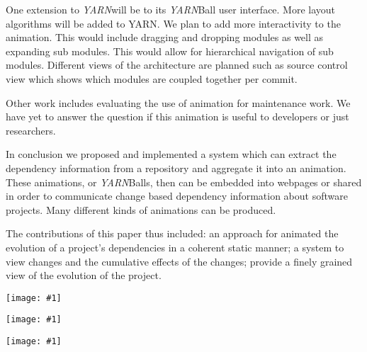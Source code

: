 \documentclass[times, 10pt,twocolumn]{article}
\newcommand{\igH}[1]{\texttt{[image: \#1]}}
\newcommand{\igW}[1]{\texttt{[image: \#1]}}
\newcommand{\yarn}{\emph{YARN\xspace}}
\newcommand{\YARN}{\yarn}
\newcommand{\postgresql}{\emph{PostgreSQL}\xspace}
\begin{document}



One extension to \YARN will be to its \YARN Ball user interface.  More
layout algorithms will be added to YARN.  We plan to add more interactivity
to the animation. This would include dragging and dropping modules as well
as expanding sub modules.  This would allow for hierarchical navigation of
sub modules.  Different views of the architecture are planned such as
source control view which shows which modules are coupled together per
commit.

Other work includes evaluating the use of animation for maintenance work.
We have yet to answer the question if this animation is useful to
developers or just researchers.




In conclusion we proposed and implemented a system which can extract the
dependency information from a repository and aggregate it into an
animation. These animations, or \YARN Balls, then can be embedded into
webpages or shared in order to communicate change based dependency
information about software projects.  Many different kinds of animations
can be produced.

The contributions of this paper thus included: an approach for animated the
evolution of a project's dependencies in a coherent static manner; a system
to view changes and the cumulative effects of the changes; provide a finely
grained view of the evolution of the project.




\begin{figure*}[p]
  \centering
    \igW{evoflash}
\caption{Screen-shot of \YARN with \postgresql}
\label{fig:evoscreen}
\end{figure*}


\begin{figure*}[p]
  \centering
  \igH{YARNApproach}
  \caption{Flow Control of Extraction with our tools}
  \label{fig:approach}
\end{figure*}

\begin{figure*}[p]
  \centering
    \igW{architecture}
\caption{Top Level Architecture of \postgresql}
\label{fig:architecture}
\end{figure*}





\end{document}
